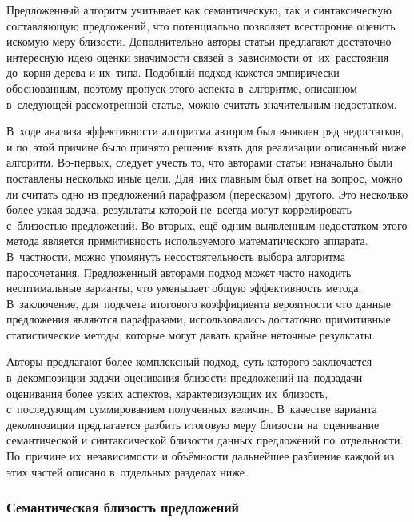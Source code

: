 Предложенный алгоритм учитывает как семантическую, так и синтаксическую составляющую предложений, 
что потенциально позволяет всесторонне оценить искомую меру близости.
Дополнительно авторы статьи предлагают достаточно интересную идею оценки значимости связей
в~зависимости от~их~расстояния до~корня дерева и их~типа.
Подобный подход кажется эмпирически обоснованным, 
поэтому пропуск этого аспекта в~алгоритме,
описанном в~следующей рассмотренной статье, можно считать значительным недостатком.

В~ходе анализа эффективности алгоритма автором был выявлен ряд недостатков,
и по~этой причине было принято решение взять для реализации описанный ниже алгоритм.
Во-первых, следует учесть то, что авторами статьи\cite{weightedDep} изначально были поставлены несколько иные цели. 
Для~них главным был ответ на вопрос, можно ли считать одно из предложений парафразом (пересказом) другого. 
Это несколько более узкая задача,
результаты которой не~всегда могут коррелировать с~близостью предложений.
Во-вторых, ещё одним выявленным недостатком этого метода является примитивность используемого математического аппарата. 
В~частности, можно упомянуть несостоятельность выбора алгоритма паросочетания. 
Предложенный авторами подход может часто находить неоптимальные варианты,
что уменьшает общую эффективность метода. 
В~заключение, для~подсчета итогового коэффициента вероятности что данные предложения
являются парафразами, использовались достаточно примитивные статистические методы,
которые могут давать крайне неточные результаты.

Авторы \cite{complexSim} предлагают более комплексный подход, 
суть которого заключается в~декомпозиции задачи
оценивания близости предложений на~подзадачи оценивания более узких аспектов, 
характеризующих их~близость, с~последующим суммированием полученных величин.
В~качестве варианта декомпозиции предлагается разбить итоговую меру близости 
на~оценивание семантической и синтаксической близости данных предложений по~отдельности.
По~причине их~независимости и объёмности дальнейшее разбиение
каждой из этих частей описано в~отдельных разделах ниже.

\subsubsection{Семантическая близость предложений}

